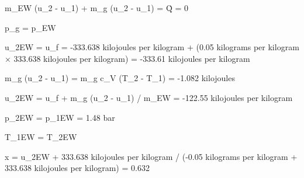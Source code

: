 m_EW (u_2 - u_1) + m_g (u_2 - u_1) = Q̇ = 0  

p_g = p_EW  

u_2EW = u_f = -333.638 kilojoules per kilogram + (0.05 kilograms per kilogram × 333.638 kilojoules per kilogram) = -333.61 kilojoules per kilogram  

m_g (u_2 - u_1) = m_g c_V (T_2 - T_1) = -1.082 kilojoules  

u_2EW = u_f + m_g (u_2 - u_1) / m_EW = -122.55 kilojoules per kilogram  

p_2EW = p_1EW = 1.48 bar  

T_1EW = T_2EW  

x = u_2EW + 333.638 kilojoules per kilogram / (-0.05 kilograms per kilogram + 333.638 kilojoules per kilogram) = 0.632